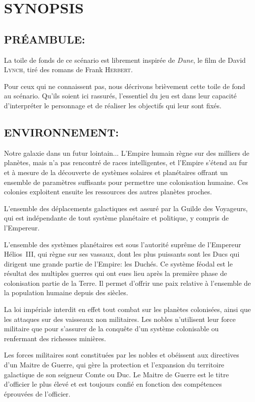 \documentclass[14pt,twocolumn]{extarticle}
\begin{document}
\section{SYNOPSIS}

\subsection{PRÉAMBULE:}

La toile de fonds de ce scénario est librement inspirée de \textit{Dune}, le
film de David \textsc{Lynch}, tiré des romans de Frank \textsc{Herbert}.

Pour ceux qui ne connaissent pas, nous décrivons brièvement cette toile de fond
au scénario. Qu'ils soient ici rassurés, l'essentiel du jeu est dans leur
capacité d'interpréter le personnage et de réaliser les objectifs qui leur
sont fixés.

\subsection{ENVIRONNEMENT:}

Notre galaxie dans un futur lointain... L'Empire humain règne sur des milliers
de planètes, mais n'a pas rencontré de races intelligentes, et l'Empire s'étend
au fur et à mesure de la découverte de systèmes solaires et planétaires offrant
un ensemble de paramètres suffisants pour permettre une colonisation humaine.
Ces colonies exploitent ensuite les ressources des autres planètes proches.

L'ensemble des déplacements galactiques est assuré par la Guilde des Voyageurs,
qui est indépendante de tout système planétaire et politique, y compris de
l'Empereur.

L'ensemble des systèmes planétaires est sous l'autorité suprême de l'Empereur
Hélios~III, qui règne sur ses vassaux, dont les plus puissants sont les Ducs
qui dirigent une grande partie de l'Empire: les Duchés. Ce système féodal est
le résultat des multiples guerres qui ont eues lieu après la première phase de
colonisation partie de la Terre. Il permet d'offrir une paix relative à
l'ensemble de la population humaine depuis des siècles.

La loi impériale interdit en effet tout combat sur les planètes colonisées,
ainsi que les attaques sur des vaisseaux non militaires. Les nobles n'utilisent
leur force militaire que pour s'assurer de la conquête d'un système colonisable
ou renfermant des richesses minières.

Les forces militaires sont constituées par les nobles et obéissent aux
directives d'un Maitre de Guerre, qui gère la protection et l'expansion du
territoire galactique de son seigneur Comte ou Duc. Le Maitre de Guerre
est le titre d'officier le plus élevé et est toujours confié en fonction des
compétences éprouvées de l'officier.
\end{document}
